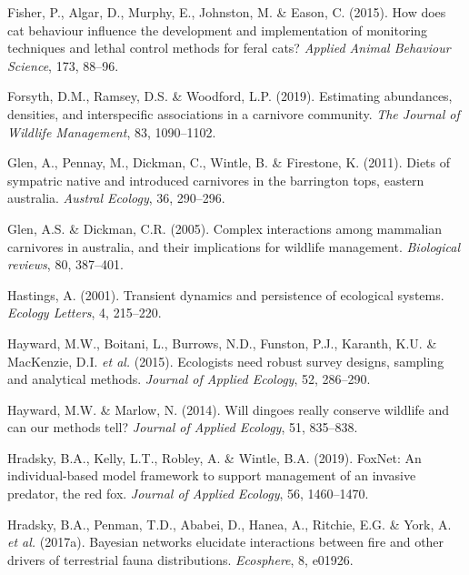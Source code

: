 \documentclass[]{elsarticle} %
\begin{document}
\leavevmode\hypertarget{ref-fisher2015}{}%
Fisher, P., Algar, D., Murphy, E., Johnston, M. \& Eason, C. (2015). How does cat behaviour influence the development and implementation of monitoring techniques and lethal control methods for feral cats? \emph{Applied Animal Behaviour Science}, 173, 88--96.

\leavevmode\hypertarget{ref-forsyth2019}{}%
Forsyth, D.M., Ramsey, D.S. \& Woodford, L.P. (2019). Estimating abundances, densities, and interspecific associations in a carnivore community. \emph{The Journal of Wildlife Management}, 83, 1090--1102.

\leavevmode\hypertarget{ref-glen2011}{}%
Glen, A., Pennay, M., Dickman, C., Wintle, B. \& Firestone, K. (2011). Diets of sympatric native and introduced carnivores in the barrington tops, eastern australia. \emph{Austral Ecology}, 36, 290--296.

\leavevmode\hypertarget{ref-glen2005}{}%
Glen, A.S. \& Dickman, C.R. (2005). Complex interactions among mammalian carnivores in australia, and their implications for wildlife management. \emph{Biological reviews}, 80, 387--401.

\leavevmode\hypertarget{ref-hastings2001}{}%
Hastings, A. (2001). Transient dynamics and persistence of ecological systems. \emph{Ecology Letters}, 4, 215--220.

\leavevmode\hypertarget{ref-hayward2015}{}%
Hayward, M.W., Boitani, L., Burrows, N.D., Funston, P.J., Karanth, K.U. \& MacKenzie, D.I. \emph{et al.} (2015). Ecologists need robust survey designs, sampling and analytical methods. \emph{Journal of Applied Ecology}, 52, 286--290.

\leavevmode\hypertarget{ref-https:ux2fux2fdoi.orgux2f10.1111ux2f1365-2664.12250}{}%
Hayward, M.W. \& Marlow, N. (2014). Will dingoes really conserve wildlife and can our methods tell? \emph{Journal of Applied Ecology}, 51, 835--838.

\leavevmode\hypertarget{ref-hradsky2019foxnet}{}%
Hradsky, B.A., Kelly, L.T., Robley, A. \& Wintle, B.A. (2019). FoxNet: An individual-based model framework to support management of an invasive predator, the red fox. \emph{Journal of Applied Ecology}, 56, 1460--1470.

\leavevmode\hypertarget{ref-hradsky2017bayesian}{}%
Hradsky, B.A., Penman, T.D., Ababei, D., Hanea, A., Ritchie, E.G. \& York, A. \emph{et al.} (2017a). Bayesian networks elucidate interactions between fire and other drivers of terrestrial fauna distributions. \emph{Ecosphere}, 8, e01926.
\end{document}
